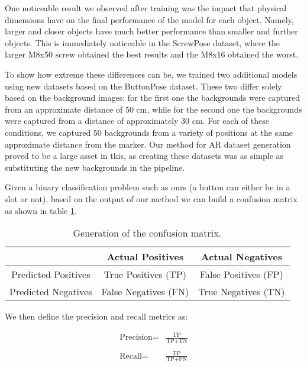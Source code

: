 
One noticeable result we observed after training was the impact that physical dimensions have on the final performance of the model for each object. Namely, larger and closer objects have much better performance than smaller and further objects. This is immediately noticeable in the ScrewPose dataset, where the larger M8x50 screw obtained the best results and the M8x16 obtained the worst.

To show how extreme these differences can be, we trained two additional models using new datasets based on the ButtonPose dataset. These two differ solely based on the background images: for the first one the backgrounds were captured from an approximate distance of 50 cm, while for the second one the backgrounds were captured from a distance of approximately 30 cm. For each of these conditions, we captured 50 backgrounds from a variety of positions at the same approximate distance from the marker. Our method for AR dataset generation proved to be a large asset in this, as creating these datasets was as simple as substituting the new backgrounds in the pipeline.


Given a binary classification problem such as ours (a button can either be in a slot or not), based on the output of our method we can build a confusion matrix as shown in table \ref{tab:cmatrix}.

\begin{table}[ht]
    \begin{center}
        \begin{tabular}{c||c|c}
            \space & Actual Positives & Actual Negatives\\
            \hline\hline
            Predicted Positives & True Positives (TP)& False Positives (FP)\\
            \hline
            Predicted Negatives & False Negatives (FN)& True Negatives (TN)\\
        \end{tabular}
        \caption{Generation of the confusion matrix.}
        \label{tab:cmatrix}
    \end{center}
\end{table}

We then define the precision and recall metrics as:

\begin{align*}
    \text{Precision} =& \frac{\text{TP}}{\text{TP}+\text{TN}} \\
    & \\
    \text{Recall} =& \frac{\text{TP}}{\text{TP}+\text{FN}}
\end{align*}

